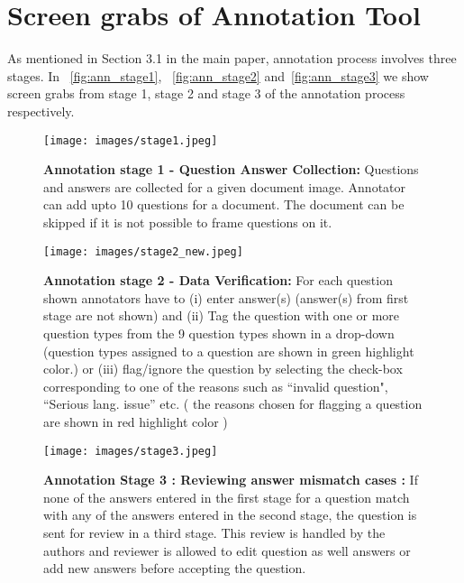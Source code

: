\documentclass[10pt,twocolumn,letterpaper]{article}
\begin{document}
\newpage

{\small


}


\appendix
{}

\newpage
\phantom{emptytext}
\newpage


\section{Screen grabs of Annotation Tool}
\label{appendix:screen grabs}

As mentioned in Section 3.1 in the main paper, annotation process involves three stages.
In ~\autoref{fig:ann_stage1}, ~\autoref{fig:ann_stage2} and~\autoref{fig:ann_stage3} we show screen grabs from stage 1, stage 2 and stage 3 of the annotation process respectively.

\begin{figure*}[h]
    \centering
    \texttt{[image: images/stage1.jpeg]}
    \caption{\textbf{Annotation stage 1 - Question Answer Collection: } Questions and answers are collected for a given document image. Annotator can add upto 10 questions for a document. The document can be skipped if it is not possible to frame questions on it.}
    \label{fig:ann_stage1}
\end{figure*}


\begin{figure*}[h]
    \centering
    \texttt{[image: images/stage2\_new.jpeg]}
    \caption{\textbf{Annotation stage 2 - Data Verification: } For each question shown annotators have to  (i) enter answer(s)  (answer(s) from first stage are not shown)  and (ii) Tag the question with one or more question types from the 9 question types shown in a drop-down (question types assigned to a question are shown in green highlight color.)  or  (iii) flag/ignore the question by selecting the  check-box corresponding to one of the reasons such as ``invalid question", ``Serious lang. issue'' etc. ( the reasons chosen for flagging a question are shown in red highlight color )}
    \label{fig:ann_stage2}
\end{figure*}


\begin{figure*}[h]
    \centering
    \texttt{[image: images/stage3.jpeg]}
    \caption{\textbf{Annotation Stage 3 : Reviewing answer mismatch cases : } If none of the answers entered in the first stage for a question  match with any of the answers entered in the second stage, the question is sent for review in a third stage. This review is handled by the authors and reviewer is allowed to edit question as well answers or add new answers before accepting the question.}
    \label{fig:ann_stage3}
\end{figure*}
\end{document}
